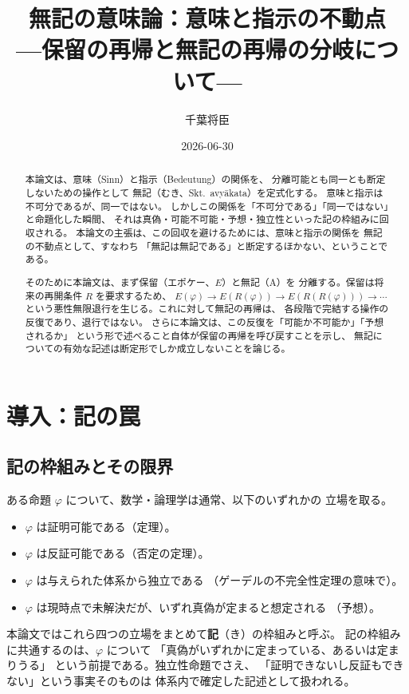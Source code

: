 \documentclass[11pt,a4paper,ja=standard,lualatex]{bxjsarticle}
\title{無記の意味論：意味と指示の不動点\\
—保留の再帰と無記の再帰の分岐について—}
\author{千葉将臣}
\date{2026-06-30}
\begin{document}
\maketitle

\begin{abstract}
本論文は、意味（Sinn）と指示（Bedeutung）の関係を、
分離可能とも同一とも断定しないための操作として
無記（むき、Skt.\ avy\=akata）を定式化する。
意味と指示は不可分であるが、同一ではない。
しかしこの関係を「不可分である」「同一ではない」と命題化した瞬間、
それは真偽・可能不可能・予想・独立性といった記の枠組みに回収される。
本論文の主張は、この回収を避けるためには、意味と指示の関係を
無記の不動点として、すなわち
「無記は無記である」と断定するほかない、ということである。

そのために本論文は、まず保留（エポケー、$E$）と無記（$\mathrm{A}$）を
分離する。保留は将来の再開条件 $R$ を要求するため、
$E(\varphi)\to E(R(\varphi))\to E(R(R(\varphi)))\to\cdots$
という悪性無限退行を生じる。これに対して無記の再帰は、
各段階で完結する操作の反復であり、退行ではない。
さらに本論文は、この反復を「可能か不可能か」「予想されるか」
という形で述べること自体が保留の再帰を呼び戻すことを示し、
無記についての有効な記述は断定形でしか成立しないことを論じる。
\end{abstract}

\tableofcontents

\section{導入：記の罠}

\subsection{記の枠組みとその限界}

ある命題 $\varphi$ について、数学・論理学は通常、以下のいずれかの
立場を取る。

\begin{itemize}
\item $\varphi$ は証明可能である（定理）。
\item $\varphi$ は反証可能である（否定の定理）。
\item $\varphi$ は与えられた体系から独立である
  （ゲーデルの不完全性定理の意味で）。
\item $\varphi$ は現時点で未解決だが、いずれ真偽が定まると想定される
  （予想）。
\end{itemize}

本論文ではこれら四つの立場をまとめて\textbf{記}（き）の枠組みと呼ぶ。
記の枠組みに共通するのは、$\varphi$ について
「真偽がいずれかに定まっている、あるいは定まりうる」
という前提である。独立性命題でさえ、
「証明できないし反証もできない」という事実そのものは
体系内で確定した記述として扱われる。
\end{document}
